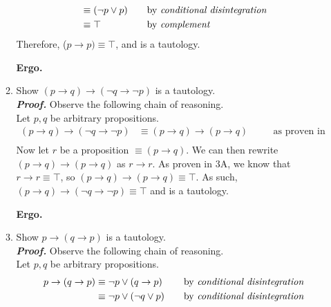 \documentclass[11pt,a4paper]{article}
\begin{document}
\begin{enumerate}
\begin{enumerate}
\begin{align*}
            &\equiv (\neg p \lor p)
                &\quad
                &\text{by \emph{conditional disintegration}} \\
            &\equiv \top
                &\quad
                &\text{by \emph{complement}}
        \end{align*}
        Therefore, ($p \rightarrow p) \equiv \top$, and is a tautology.
        \begin{flushright}
            \textbf{Ergo.}
        \end{flushright}
        \pagebreak
        \item 
        Show $(p \rightarrow q) \rightarrow (\neg q \rightarrow \neg p)$ is a tautology. \\
        \emph{\textbf{Proof.}} Observe the following chain of reasoning. \\ 
        Let $p, q$ be arbitrary propositions.
        \begin{align*}
        (p \rightarrow q) \rightarrow (\neg q \rightarrow \neg p)
            &\equiv (p \rightarrow q) \rightarrow (p \rightarrow q)
                &\quad
                &\text{as proven in 2A} \\
        \end{align*}
        Now let $r$ be a proposition $\equiv (p \rightarrow q)$. We can then rewrite $(p \rightarrow q) \rightarrow (p \rightarrow q)$ as $r \rightarrow r$. As proven in 3A, we know that $r \rightarrow r \equiv \top$, so $(p \rightarrow q) \rightarrow (p \rightarrow q) \equiv \top$. As such, $(p \rightarrow q) \rightarrow (\neg q \rightarrow \neg p) \equiv \top$ and is a tautology.
        \begin{flushright}
            \textbf{Ergo.}
        \end{flushright}
        \item 
        Show $p \rightarrow (q \rightarrow p)$ is a tautology. \\
        \emph{\textbf{Proof.}} Observe the following chain of reasoning. \\ 
        Let $p, q$ be arbitrary propositions.
        \begin{align*}
        p \rightarrow (q \rightarrow p)
            &\equiv \neg p \lor (q \rightarrow p)
                &\quad
                &\text{by \emph{conditional disintegration}} \\
            &\equiv \neg p \lor (\neg q \lor p)
                &\quad
                &\text{by \emph{conditional disintegration}} \\

\end{align*}
\end{enumerate}
\end{enumerate}
\end{document}
